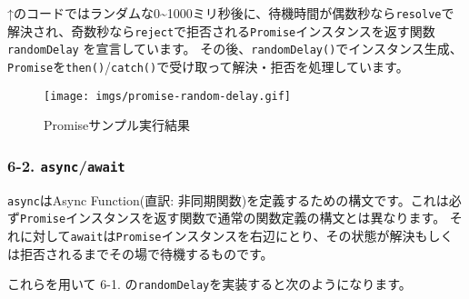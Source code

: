 ↑のコードではランダムな0\textasciitilde1000ミリ秒後に、待機時間が偶数秒なら\texttt{resolve}で解決され、奇数秒なら\texttt{reject}で拒否される\texttt{Promise}インスタンスを返す関数
\texttt{randomDelay} を宣言しています。
その後、\texttt{randomDelay()}でインスタンス生成、\texttt{Promise}を\texttt{then()}/\texttt{catch()}で受け取って解決・拒否を処理しています。

\begin{figure}
\centering
\texttt{[image: imgs/promise-random-delay.gif]}
\caption{Promiseサンプル実行結果}
\end{figure}

\subsubsection{\texorpdfstring{6-2.
\texttt{async}/\texttt{await}}{6-2. async/await}}\label{asyncawait}

\texttt{async}はAsync Function(直訳:
非同期関数)を定義するための構文です。これは必ず\texttt{Promise}インスタンスを返す関数で通常の関数定義の構文とは異なります。
それに対して\texttt{await}は\texttt{Promise}インスタンスを右辺にとり、その状態が解決もしくは拒否されるまでその場で待機するものです。

これらを用いて 6-1.
の\texttt{randomDelay}を実装すると次のようになります。

